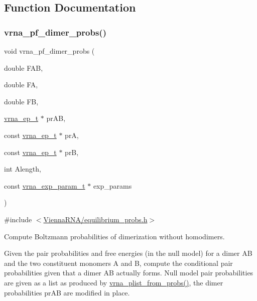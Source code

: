 \subsection{Function Documentation}
\mbox{\label{group__pf__cofold_gaa1e39e73afb51fbaf4ae38f0c066c46b}} 
\subsubsection{\texorpdfstring{vrna\+\_\+pf\+\_\+dimer\+\_\+probs()}{vrna\_pf\_dimer\_probs()}}
{\footnotesize\ttfamily void vrna\+\_\+pf\+\_\+dimer\+\_\+probs (\begin{DoxyParamCaption}\item[{double}]{F\+AB,  }\item[{double}]{FA,  }\item[{double}]{FB,  }\item[{\hyperlink{group__struct__utils_gab9ac98ab55ded9fb90043b024b915aca}{vrna\+\_\+ep\+\_\+t} $\ast$}]{pr\+AB,  }\item[{const \hyperlink{group__struct__utils_gab9ac98ab55ded9fb90043b024b915aca}{vrna\+\_\+ep\+\_\+t} $\ast$}]{prA,  }\item[{const \hyperlink{group__struct__utils_gab9ac98ab55ded9fb90043b024b915aca}{vrna\+\_\+ep\+\_\+t} $\ast$}]{prB,  }\item[{int}]{Alength,  }\item[{const \hyperlink{group__energy__parameters_ga01d8b92fe734df8d79a6169482c7d8d8}{vrna\+\_\+exp\+\_\+param\+\_\+t} $\ast$}]{exp\+\_\+params }\end{DoxyParamCaption})}



{\ttfamily \#include $<$\hyperlink{equilibrium__probs_8h}{Vienna\+R\+N\+A/equilibrium\+\_\+probs.\+h}$>$}



Compute Boltzmann probabilities of dimerization without homodimers. 

Given the pair probabilities and free energies (in the null model) for a dimer AB and the two constituent monomers A and B, compute the conditional pair probabilities given that a dimer AB actually forms. Null model pair probabilities are given as a list as produced by \hyperlink{group__pf__fold_ga94f6efc0b8d8712b023452794a0a5bd2}{vrna\+\_\+plist\+\_\+from\+\_\+probs()}, the dimer probabilities \textquotesingle{}pr\+AB\textquotesingle{} are modified in place.


